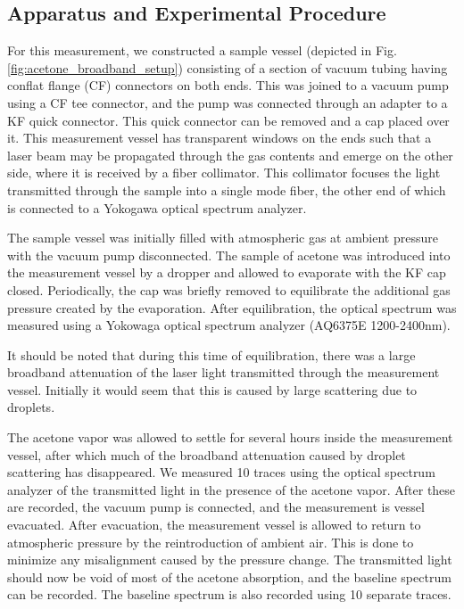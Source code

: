 \documentclass[12pt]{report}
\begin{document}
	\subsection{Apparatus and Experimental Procedure}
	
	For this measurement, we constructed a sample vessel (depicted in Fig. \ref{fig:acetone_broadband_setup}) consisting of a section of vacuum tubing having conflat flange (CF) connectors on both ends. This was joined to a vacuum pump using a CF tee connector, and the pump was connected through an adapter to a KF quick connector. This quick connector can be removed and a cap placed over it. This measurement vessel has transparent windows on the ends such that a laser beam may be propagated through the gas contents and emerge on the other side, where it is received by a fiber collimator. This collimator focuses the light transmitted through the sample into a single mode fiber, the other end of which is connected to a Yokogawa optical spectrum analyzer.
	
	The sample vessel was initially filled with atmospheric gas at ambient pressure with the vacuum pump disconnected. The sample of acetone was introduced into the measurement vessel by a dropper and allowed to evaporate with the KF cap closed. Periodically, the cap was briefly removed to equilibrate the additional gas pressure created by the evaporation. After equilibration, the optical spectrum was measured using a Yokowaga optical spectrum analyzer (AQ6375E 1200-2400nm).
	
	It should be noted that during this time of equilibration, there was a large broadband attenuation of the laser light transmitted through the measurement vessel. Initially it would seem that this is caused by large scattering due to droplets.
	
	The acetone vapor was allowed to settle for several hours inside the measurement vessel, after which much of the broadband attenuation caused by droplet scattering has disappeared. We measured 10 traces using the optical spectrum analyzer of the transmitted light in the presence of the acetone vapor. After these are recorded, the vacuum pump is connected, and the measurement is vessel evacuated. After evacuation, the measurement vessel is allowed to return to atmospheric pressure by the reintroduction of ambient air. This is done to minimize any misalignment caused by the pressure change. The transmitted light should now be void of most of the acetone absorption, and the baseline spectrum can be recorded. The baseline spectrum is also recorded using 10 separate traces.
	
\end{document}

